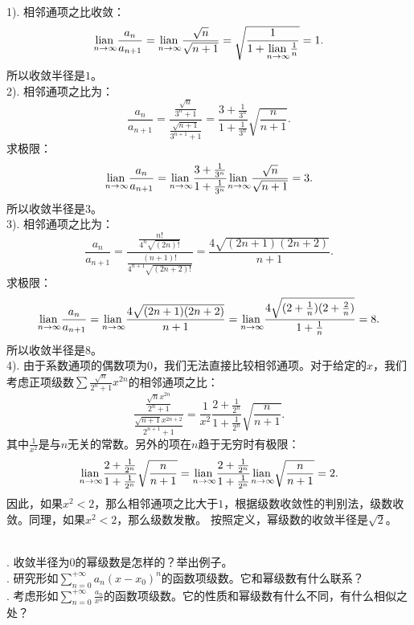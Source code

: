 \documentclass[12pt,UTF8,fontset=none]{ctexbook}
\begin{document}
\begin{so}
    \mbox{} \\
    1). 相邻通项之比收敛：
    $$ \underset{n\to\infty}{\operatorname{lian}\,} \frac{a_n}{a_{n+1}} = \underset{n\to\infty}{\operatorname{lian}\,} \frac{\sqrt{n}}{\sqrt{n+1}} = \sqrt{\frac{1}{1 + \underset{n\to\infty}{\operatorname{lian}\,} \frac{1}{n}}} = 1. $$
    所以收敛半径是$1$。\\
    2). 相邻通项之比为：
    $$ \frac{a_n}{a_{n+1}} = \frac{\frac{\sqrt{n}}{3^n + 1}}{\frac{\sqrt{n+1}}{3^{n+1} + 1}} = \frac{3 + \frac{1}{3^n}}{1 + \frac{1}{3^n}}\sqrt{\frac{n}{n+1}}. $$
    求极限：
    $$ \underset{n\to\infty}{\operatorname{lian}\,} \frac{a_n}{a_{n+1}} = \underset{n\to\infty}{\operatorname{lian}\,} \frac{3 + \frac{1}{3^n}}{1 + \frac{1}{3^n}}\underset{n\to\infty}{\operatorname{lian}\,} \frac{\sqrt{n}}{\sqrt{n+1}} = 3. $$
    所以收敛半径是$3$。\\
    3). 相邻通项之比为：
    $$ \frac{a_n}{a_{n+1}} = \frac{\frac{n!}{4^n\sqrt{(2n)!}}}{\frac{(n+1)!}{4^{n+1}\sqrt{(2n+2)!}}} = \frac{4\sqrt{(2n+1)(2n+2)}}{n+1}. $$
    求极限：
    $$ \underset{n\to\infty}{\operatorname{lian}\,} \frac{a_n}{a_{n+1}} = \underset{n\to\infty}{\operatorname{lian}\,}\frac{4\sqrt{(2n+1)(2n+2)}}{n+1} = \underset{n\to\infty}{\operatorname{lian}\,}\frac{4\sqrt{(2+\frac{1}{n})(2+\frac{2}{n})}}{1+\frac{1}{n}} = 8. $$
    所以收敛半径是$8$。\\
    4). 由于系数通项的偶数项为$0$，我们无法直接比较相邻通项。对于给定的$x$，我们考虑正项级数$\sum \frac{\sqrt{n}}{2^n+1} x^{2n}$的相邻通项之比：
    $$ \frac{\frac{\sqrt{n}x^{2n}}{2^n+1}}{\frac{\sqrt{n+1}x^{2n+2}}{2^{n+1}+1}} = \frac{1}{x^2}\frac{2 + \frac{1}{2^n}}{1 + \frac{1}{2^n}}\sqrt{\frac{n}{n+1}}. $$
    其中$\frac{1}{x^2}$是与$n$无关的常数。另外的项在$n$趋于无穷时有极限：
    $$ \underset{n\to\infty}{\operatorname{lian}\,}\frac{2 + \frac{1}{2^n}}{1 + \frac{1}{2^n}}\sqrt{\frac{n}{n+1}} = \underset{n\to\infty}{\operatorname{lian}\,}\frac{2 + \frac{1}{2^n}}{1 + \frac{1}{2^n}}\underset{n\to\infty}{\operatorname{lian}\,}\sqrt{\frac{n}{n+1}} = 2. $$
    因此，如果$x^2<2$，那么相邻通项之比大于$1$，根据级数收敛性的判别法，级数收敛。同理，如果$x^2<2$，那么级数发散。
    按照定义，幂级数的收敛半径是$\sqrt{2}$。

\end{so}

\begin{sk}
    \mbox{} \\
    . 收敛半径为$0$的幂级数是怎样的？举出例子。 \\
    . 研究形如$\sum_{n=0}^{+\infty} a_n (x - x_0)^n$的函数项级数。它和幂级数有什么联系？\\
    . 考虑形如$\sum_{n=0}^{+\infty} \frac{a_n}{x^n}$的函数项级数。它的性质和幂级数有什么不同，有什么相似之处？
\end{sk}
\end{document}
